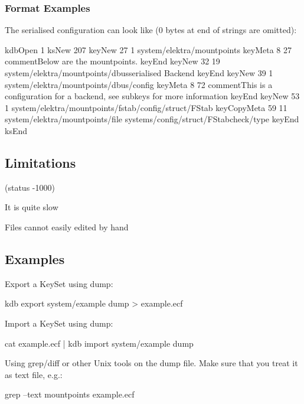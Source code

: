\subsubsection*{Format Examples}

The serialised configuration can look like (0 bytes at end of strings are omitted)\+: \begin{DoxyVerb}kdbOpen 1
ksNew 207
keyNew 27 1
system/elektra/mountpoints
keyMeta 8 27
commentBelow are the mountpoints.
keyEnd
keyNew 32 19
system/elektra/mountpoints/dbusserialised Backend
keyEnd keyNew 39 1
system/elektra/mountpoints/dbus/config
keyMeta 8 72
commentThis is a configuration for a backend, see subkeys for more information
keyEnd
keyNew 53 1
system/elektra/mountpoints/fstab/config/struct/FStab
keyCopyMeta 59 11
system/elektra/mountpoints/file
systems/config/struct/FStabcheck/type
keyEnd
ksEnd
\end{DoxyVerb}


\subsection*{Limitations}

(status -\/1000)


\begin{DoxyItemize}
\item It is quite slow
\item Files cannot easily edited by hand
\end{DoxyItemize}

\subsection*{Examples}

Export a Key\+Set using {\ttfamily dump}\+: \begin{DoxyVerb}kdb export system/example dump > example.ecf
\end{DoxyVerb}


Import a Key\+Set using {\ttfamily dump}\+: \begin{DoxyVerb}cat example.ecf | kdb import system/example dump
\end{DoxyVerb}


Using grep/diff or other Unix tools on the dump file. Make sure that you treat it as text file, e.\+g.\+: \begin{DoxyVerb}grep --text mountpoints example.ecf\end{DoxyVerb}
 